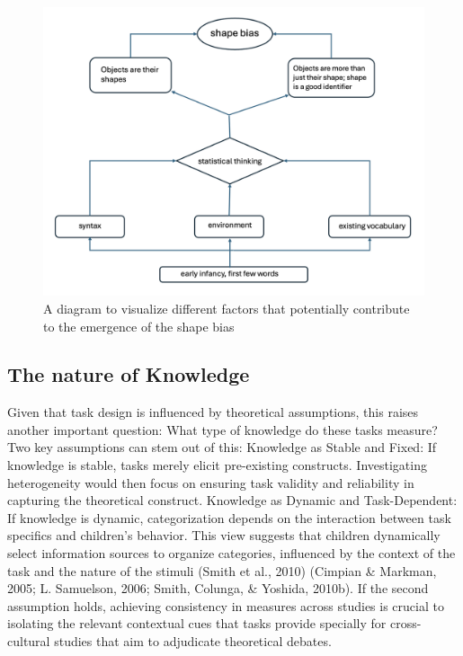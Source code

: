 \documentclass[10pt, letterpaper]{article}
\newenvironment{CodeChunk}{}{}
\begin{document}
\begin{CodeChunk}
\begin{figure}[tb]
\includegraphics[width=1\linewidth]{conceptual_diagram} \caption[A diagram to visualize different factors that potentially contribute to the emergence of the shape bias]{A diagram to visualize different factors that potentially contribute to the emergence of the shape bias}\label{fig:flow_diagram }
\end{figure}
\end{CodeChunk}

\hypertarget{the-nature-of-knowledge}{%
\subsection{The nature of Knowledge}\label{the-nature-of-knowledge}}

Given that task design is influenced by theoretical assumptions, this
raises another important question: What type of knowledge do these tasks
measure? Two key assumptions can stem out of this: Knowledge as Stable
and Fixed: If knowledge is stable, tasks merely elicit pre-existing
constructs. Investigating heterogeneity would then focus on ensuring
task validity and reliability in capturing the theoretical construct.
Knowledge as Dynamic and Task-Dependent: If knowledge is dynamic,
categorization depends on the interaction between task specifics and
children's behavior. This view suggests that children dynamically select
information sources to organize categories, influenced by the context of
the task and the nature of the stimuli (Smith et al., 2010) (Cimpian \&
Markman, 2005; L. Samuelson, 2006; Smith, Colunga, \& Yoshida, 2010b).
If the second assumption holds, achieving consistency in measures across
studies is crucial to isolating the relevant contextual cues that tasks
provide specially for cross-cultural studies that aim to adjudicate
theoretical debates.
\end{document}
